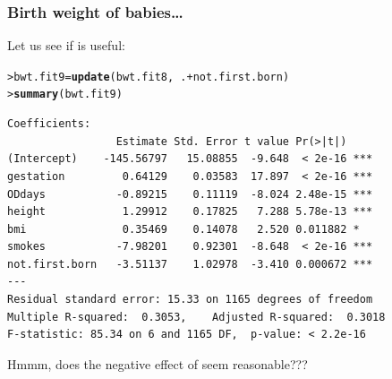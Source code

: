 \documentclass{beamer}\usepackage[]{graphicx}\usepackage[]{xcolor}
\makeatletter
\newcommand{\hlopt}[1]{\textcolor[rgb]{0,0,0}{#1}}%
\newcommand{\hlstd}[1]{\textcolor[rgb]{0.345,0.345,0.345}{#1}}%
\newcommand{\hlkwb}[1]{\textcolor[rgb]{0.69,0.353,0.396}{#1}}%
\newcommand{\hlkwd}[1]{\textcolor[rgb]{0.737,0.353,0.396}{\textbf{#1}}}%
\newenvironment{kframe}{%
 \def\at@end@of@kframe{}%
 \ifinner\ifhmode%
  \def\at@end@of@kframe{\end{minipage}}%
  \begin{minipage}{\columnwidth}%
 \fi\fi%
 \def\FrameCommand##1{\hskip\@totalleftmargin \hskip-\fboxsep
 \colorbox{shadecolor}{##1}\hskip-\fboxsep
     \hskip-\linewidth \hskip-\@totalleftmargin \hskip\columnwidth}%
 \MakeFramed {\advance\hsize-\width
   \@totalleftmargin\z@ \linewidth\hsize
   \@setminipage}}%
 {\par\unskip\endMakeFramed%
 \at@end@of@kframe}
\newenvironment{knitrout}{}{} %
\makeatother
\begin{document}
\begin{frame}[fragile]
\frametitle{Birth weight of babies\ldots}
Let us see if  is useful:

\begin{knitrout}\scriptsize
{}\color{fgcolor}\begin{kframe}
\begin{alltt}
\hlstd{> }\hlstd{bwt.fit9}\hlkwb{=}\hlkwd{update}\hlstd{(bwt.fit8,}\hlopt{~}\hlstd{.} \hlopt{+} \hlstd{not.first.born)}
\hlstd{> }\hlkwd{summary}\hlstd{(bwt.fit9)}
\end{alltt}
\end{kframe}
\end{knitrout}

\begin{knitrout}\scriptsize
{}\color{fgcolor}\begin{kframe}
\begin{verbatim}
Coefficients:
                 Estimate Std. Error t value Pr(>|t|)    
(Intercept)    -145.56797   15.08855  -9.648  < 2e-16 ***
gestation         0.64129    0.03583  17.897  < 2e-16 ***
ODdays           -0.89215    0.11119  -8.024 2.48e-15 ***
height            1.29912    0.17825   7.288 5.78e-13 ***
bmi               0.35469    0.14078   2.520 0.011882 *  
smokes           -7.98201    0.92301  -8.648  < 2e-16 ***
not.first.born   -3.51137    1.02978  -3.410 0.000672 ***
---
Residual standard error: 15.33 on 1165 degrees of freedom
Multiple R-squared:  0.3053,	Adjusted R-squared:  0.3018 
F-statistic: 85.34 on 6 and 1165 DF,  p-value: < 2.2e-16
\end{verbatim}
\end{kframe}
\end{knitrout}
Hmmm, does the negative effect of  seem reasonable???
\end{frame}
\end{document}
